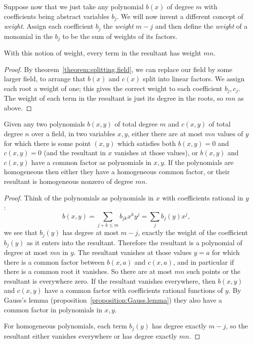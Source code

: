 Suppose now that we just take any polynomial \(b(x)\) of degree \(m\) with coefficients being abstract variables \(b_j\). 
We will now invent a different concept of \emph{weight}.
Assign each coefficient \(b_j\) the \emph{weight} \(m-j\) and then define the \emph{weight} of a monomial in the \(b_j\) to be  the sum of weights of its factors.
\begin{lemma}
With this notion of weight, every term in the resultant has weight \(mn\).
\end{lemma}
\begin{proof}
By theorem~\vref{theorem:splitting.field}, we can replace our field by some larger field, to arrange that \(b(x)\) and \(c(x)\) split into linear factors.
We assign each root a weight of one; this gives the correct weight to each coefficient \(b_j,c_j\).
The weight of each term in the resultant is just its degree in the roots, so \(mn\) as above.
\end{proof}
\begin{proposition}\label{proposition:resultant.degree}
Given any two polynomials \(b(x,y)\) of total degree \(m\) and \(c(x,y)\) of total degree \(n\) over a field, in two variables \(x,y\), either there are at most \(mn\) values of \(y\) for which there is some point \((x,y)\) which satisfies both \(b(x,y)=0\) and \(c(x,y)=0\) (and the resultant in \(x\) vanishes at those values), or \(b(x,y)\) and \(c(x,y)\) have a common factor as polynomials in \(x,y\).
If the polynomials are homogeneous then either they have a homogeneous common factor, or their resultant is homogeneous nonzero of degree \(mn\).
\end{proposition}
\begin{proof}
Think of the polynomials as polynomials in \(x\) with coefficients rational in \(y\):
\[
b(x,y)=\sum_{j+k \le m} b_{jk} x^k y^j=\sum_j b_j(y) x^j,
\]
we see that \(b_j(y)\) has degree at most \(m-j\), exactly the weight of the coefficient \(b_j(y)\) as it enters into the resultant.
Therefore the resultant is a polynomial of degree at most \(mn\) in \(y\).
The resultant vanishes at those values \(y=a\) for which there is a common factor between \(b(x,a)\) and \(c(x,a)\), and in particular if there is a common root it vanishes.
So there are at most \(mn\) such points or the resultant is everywhere zero.
If the resultant vanishes everywhere, then \(b(x,y)\) and \(c(x,y)\) have a common factor with coefficients rational functions of \(y\).
By Gauss's lemma (proposition~\vref{proposition:Gauss.lemma}) they also have a common factor in polynomials in \(x,y\). 

For homogeneous polynomials, each term \(b_j(y)\) has degree exactly \(m-j\), so the resultant either vanishes everywhere or has degree exactly \(mn\).
\end{proof}
